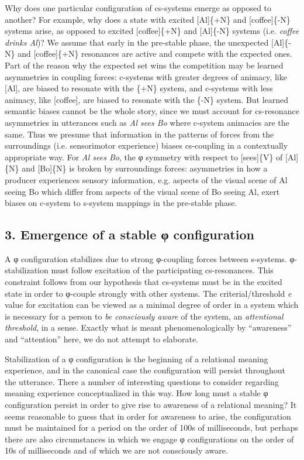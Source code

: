   Why does one particular configuration of cs-systems emerge as opposed to another? For example, why does a state with excited [Al]\{+N\} and [coffee]\{-N\} systems arise, as opposed to excited [coffee]\{+N\} and [Al]\{-N\} systems (i.e. \textit{coffee drinks Al})? We assume that early in the pre-stable phase, the unexpected [Al]\{-N\} and [coffee]\{+N\} resonances are active and compete with the expected ones. Part of the reason why the expected set wins the competition may be learned asymmetries in coupling forces: c-systems with greater degrees of animacy, like [Al], are biased to resonate with the \{+N\} system, and c-systems with less animacy, like [coffee], are biased to resonate with the \{-N\} system. But learned semantic biases cannot be the whole story, since we must account for cs-resonance asymmetries in utterances such as \textit{Al sees Bo} where c-system animacies are the same. Thus we presume that information in the patterns of forces from the surroundings (i.e. sensorimotor experience) biases cs-coupling in a contextually appropriate way. For \textit{Al sees Bo}, the φ symmetry with respect to [sees]\{V\} of [Al]\{N\} and [Bo]\{N\} is broken by surroundings forces: asymmetries in how a producer experiences sensory information, e.g. aspects of the visual scene of Al seeing Bo which differ from aspects of the visual scene of Bo seeing Al, exert biases on c-system to s-system mappings in the pre-stable phase.

\subsection{3. Emergence of a stable φ configuration}

A φ configuration stabilizes due to strong φ{}-coupling forces between s-systems. φ{}-stabilization must follow excitation of the participating cs-resonances. This constraint follows from our hypothesis that cs-systems must be in the excited state in order to φ-couple strongly with other systems. The criterial/threshold \textit{e} value for excitation can be viewed as a minimal degree of order in a system which is necessary for a person to \textit{be consciously aware} of the system, an \textit{attentional threshold}, in a sense. Exactly what is meant phenomenologically by “awareness” and “attention” here, we do not attempt to elaborate. 

   Stabilization of a φ configuration is the beginning of a relational meaning experience, and in the canonical case the configuration will persist throughout the utterance. There a number of interesting questions to consider regarding meaning experience conceptualized in this way. How long must a stable φ configuration persist in order to give rise to awareness of a relational meaning? It seems reasonable to guess that in order for awareness to arise, the configuration must be maintained for a period on the order of 100s of milliseconds, but perhaps there are also circumstances in which we engage φ configurations on the order of 10s of milliseconds and of which we are not consciously aware.


